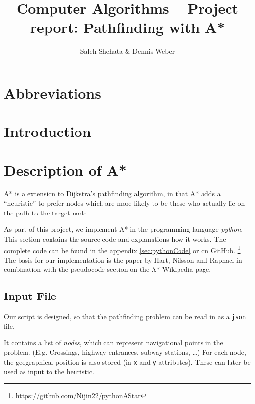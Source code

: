 \documentclass[12pt]{article}
\begin{document}
	
\title{Computer Algorithms -- Project report: Pathfinding with A*}
\author{Saleh Shehata \& Dennis Weber}
\maketitle

\begin{abstract}
\end{abstract}

\section*{Abbreviations}
\begin{acronym}[SIFT]
	\setlength{\parskip}{0ex}
	\setlength{\itemsep}{1ex}
\end{acronym}

\section{Introduction}

\section{Description of A*}
A* is a extension to Dijkstra's pathfinding algorithm\cite{Dijkstra1959}, in that A* adds a \enquote{heuristic} to prefer nodes which are more likely to be those who actually lie on the path to the target node.

As part of this project, we implement A* in the programming language \textit{python}. This section contains the source code and explanations how it works.
The complete code can be found in the appendix \ref{sec:pythonCode} or on GitHub.
\footnote{\url{https://github.com/Nijin22/pythonAStar}}
The basis for our implementation is the paper by Hart, Nilsson and Raphael\cite{hartNilssonRaphael} in combination with the pseudocode section on the A* Wikipedia page.\cite{wiki:astar}

\subsection{Input File}
Our script is designed, so that the pathfinding problem can be read in as a \texttt{json} file.

It contains a list of \textit{nodes}, which can represent navigational points in the problem.
(E.g. Crossings, highway entrances, subway stations, \ldots)
For each node, the geographical position is also stored (in \texttt{x} and \texttt{y} attributes).
These can later be used as input to the heuristic.
\end{document}
